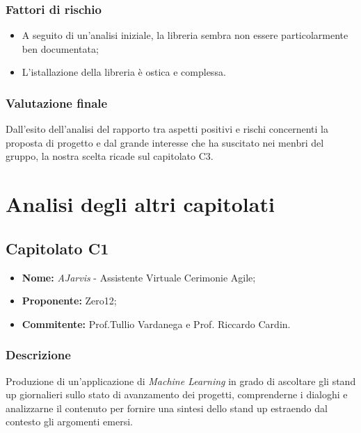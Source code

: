 \documentclass[openany,12pt,a4paper]{report}
\begin{document}
	\subsection{Fattori di rischio}
	
	\begin{itemize}
		\item A seguito di un'analisi iniziale, la libreria sembra non essere particolarmente ben documentata;
		
		\item L'istallazione della libreria è ostica e complessa.
	\end{itemize}
	
	\subsection{Valutazione finale}
	
	Dall'esito dell'analisi del rapporto tra aspetti positivi e rischi concernenti la proposta di progetto e dal grande interesse che ha suscitato nei menbri del gruppo, la nostra scelta ricade sul capitolato C3.
	
	\chapter{Analisi degli altri capitolati}
	
	
	\section{Capitolato C1}
	
	\begin{itemize}
		\item \textbf{Nome:} \textit{AJarvis} - Assistente Virtuale Cerimonie Agile;
		\item \textbf{Proponente:} Zero12;
		\item \textbf{Commitente:} Prof.Tullio Vardanega e Prof. Riccardo Cardin.
	\end{itemize}
	
	\subsection{Descrizione}
	
	Produzione di un’applicazione di \textit{Machine Learning} in grado di ascoltare gli stand up giornalieri sullo stato di avanzamento dei progetti, comprenderne i dialoghi e analizzarne il contenuto per fornire una sintesi dello stand up estraendo dal contesto gli argomenti emersi.
	
\end{document}
